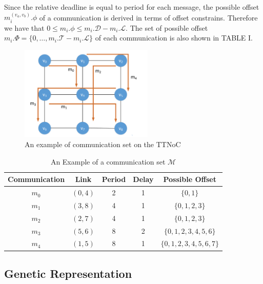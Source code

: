 \documentclass[journal]{IEEEtran}
\begin{document}
Since the relative deadline is equal to period for each message, the possible offset $m_{i}^{(v_{a},v_{b})}.\phi$ of a communication is derived in terms of offset constrains. Therefore we have that
$	
0 
\leq 
m_{i}.\phi 
\leq
m_{i}.\mathcal{D} - m_{i}.\mathcal{L} 
$.
The set of possible offset $m_{i}.\Phi = \{ 0,\dots,m_{i}.\mathcal{T} - m_{i}.\mathcal{L}\}$ of each communication is also shown in TABLE I.
\begin{figure}[!t]
	\centering
	\includegraphics[width=2.5in]{picture/scheduling_example.pdf}
	\caption{An example of communication set on the TTNoC}
	\label{f:comm_on_TTNoC}
\end{figure}
\begin{table}[!t]
	\renewcommand{\arraystretch}{1.3}
	\caption{An Example of a communication set $\mathcal{M}$}
	\label{t:comm_info}
	\centering
	\begin{tabular}{|c||c||c||c||c|}
		\hline
		\textbf{Communication} & \textbf{Link} & \textbf{Period} & \textbf{Delay} & \textbf{Possible Offset}\\
		\hline
		$m_{0}$ & $ (0,4) $ & 2 & 1 & $\{0,1\}$\\
		\hline
		$m_{1}$ & $ (3,8) $ & 4 & 1 & $\{0,1,2,3\}$\\
		\hline
		$m_{2}$ & $ (2,7) $ & 4 & 1 & $\{0,1,2,3\}$\\
		\hline		
		$m_{3}$ & $ (5,6) $ & 8 & 2 & $\{0,1,2,3,4,5,6\}$\\
		\hline
		$m_{4}$ & $ (1,5) $ & 8 & 1 & $\{0,1,2,3,4,5,6,7\}$\\
		\hline		
	\end{tabular}
\end{table}

\subsection{Genetic Representation}
\end{document}
